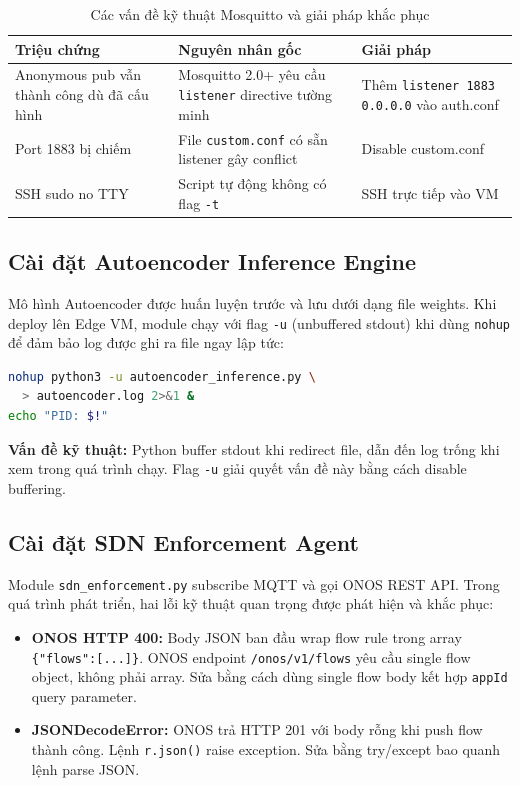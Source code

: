 \begin{table}[htbp]
\caption{Các vấn đề kỹ thuật Mosquitto và giải pháp khắc phục}
\label{tab:mosquitto_issues}
\centering
\begin{tabular}{p{}p{}p{}}
\toprule
\textbf{Triệu chứng} & \textbf{Nguyên nhân gốc} & \textbf{Giải pháp} \\
\midrule
Anonymous pub vẫn thành công dù đã cấu hình & Mosquitto 2.0+ yêu cầu \texttt{listener} directive tường minh & Thêm \texttt{listener 1883 0.0.0.0} vào auth.conf \\[4pt]
Port 1883 bị chiếm & File \texttt{custom.conf} có sẵn listener gây conflict & Disable custom.conf \\[4pt]
SSH sudo no TTY & Script tự động không có flag \texttt{-t} & SSH trực tiếp vào VM \\
\bottomrule
\end{tabular}
\end{table}

\subsection{Cài đặt Autoencoder Inference Engine}

Mô hình Autoencoder được huấn luyện trước và lưu dưới dạng file weights. Khi deploy lên Edge VM, module chạy với flag \texttt{-u} (unbuffered stdout) khi dùng \texttt{nohup} để đảm bảo log được ghi ra file ngay lập tức:

\begin{lstlisting}[language=bash, caption={Khởi động Autoencoder Inference (nền)}]
nohup python3 -u autoencoder_inference.py \
  > autoencoder.log 2>&1 &
echo "PID: $!"
\end{lstlisting}

\textbf{Vấn đề kỹ thuật:} Python buffer stdout khi redirect file, dẫn đến log trống khi xem trong quá trình chạy. Flag \texttt{-u} giải quyết vấn đề này bằng cách disable buffering.

\subsection{Cài đặt SDN Enforcement Agent}

Module \texttt{sdn\_enforcement.py} subscribe MQTT và gọi ONOS REST API. Trong quá trình phát triển, hai lỗi kỹ thuật quan trọng được phát hiện và khắc phục:

\begin{itemize}
    \item \textbf{ONOS HTTP 400:} Body JSON ban đầu wrap flow rule trong array \texttt{\{"flows":[...]\}}. ONOS endpoint \texttt{/onos/v1/flows} yêu cầu single flow object, không phải array. Sửa bằng cách dùng single flow body kết hợp \texttt{appId} query parameter.
    \item \textbf{JSONDecodeError:} ONOS trả HTTP 201 với body rỗng khi push flow thành công. Lệnh \texttt{r.json()} raise exception. Sửa bằng try/except bao quanh lệnh parse JSON.
\end{itemize}

